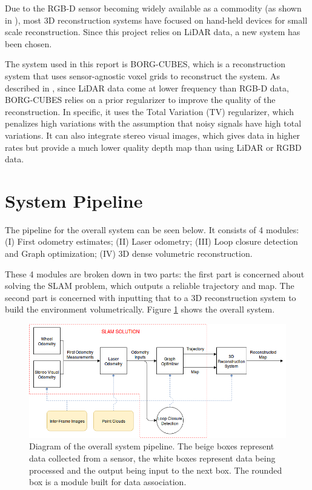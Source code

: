 \documentclass[11pt]{article}
\begin{document}
Due to the RGB-D sensor becoming widely available as a commodity (as shown in \cite{kinectfusion}), most 3D reconstruction systems have focused on hand-held devices for small scale reconstruction. Since this project relies on LiDAR data, a new system has been chosen.	
	
The system used in this report is BORG-CUBES, which is a reconstruction system that uses sensor-agnostic voxel grids to reconstruct the system. As described in \cite{TannerArXiv2016}, since LiDAR data come at lower frequency than RGB-D data, BORG-CUBES relies on a prior regularizer to improve the quality of the reconstruction. In specific, it uses the Total Variation (TV) regularizer, which penalizes high variations with the assumption that noisy signals have high total variations. It can also integrate stereo visual images, which gives data in higher rates but provide a much lower quality depth map than using LiDAR or RGBD data.	

	\newpage
	\section{System Pipeline} \label{pipeline}

The pipeline for the overall system can be seen below. It consists of 4 modules: (I) First odometry estimates; (II) Laser odometry; (III) Loop closure detection and Graph optimization; (IV) 3D dense volumetric reconstruction.

These 4 modules are broken down in two parts: the first part is concerned about solving the SLAM problem, which outputs a reliable trajectory and map. The second part is concerned with inputting that to a 3D reconstruction system to build the environment volumetrically. Figure \ref{fig:SystemPipelineFigure1} shows the overall system.

\begin{figure}[h]
\includegraphics[width=\linewidth]{SystemPipeline}
\caption{Diagram of the overall system pipeline. The beige boxes represent data collected from a sensor, the white boxes represent data being processed and the output being input to the next box. The rounded box is a module built for data association.}
\label{fig:SystemPipelineFigure1}
\end{figure}
	
\end{document}
